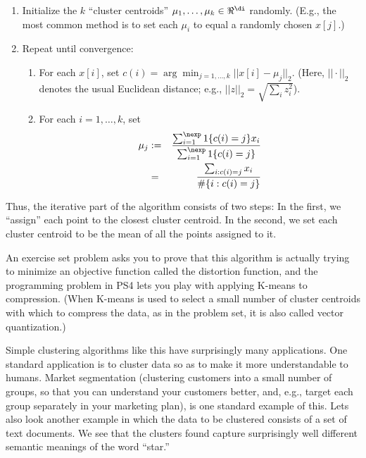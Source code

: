 \begin{enumerate}
\item Initialize the $k$ ``cluster centroids'' $\mu_1, \ldots, \mu_k \in \Re^\di$ randomly.  
(E.g., the most common method is to set each $\mu_i$ to equal a randomly chosen $x[j]$.) 
\item Repeat until convergence: 
\begin{enumerate} 
\item For each $x[i]$, set $c(i) = \arg \min_{j=1,\ldots,k} ||x[i] - \mu_j||_2$.
(Here, $||\cdot||_2$ denotes the usual Euclidean distance; e.g., 
$||z||_2 = \sqrt{\sum_i z_i^2}$). 
\item For each $i=1,\ldots,k$, set
\begin{eqnarray*}
\mu_j &:=& \frac{\sum_{i=1}^\nexp 1\{c(i)=j\}x_i}{\sum_{i=1}^\nexp 1\{c(i)=j\}} \\
      &=& \frac{\sum_{i : c(i) = j} x_i}{\#\{i : c(i) = j\}}
\end{eqnarray*}
\end{enumerate}
\end{enumerate}

Thus, the iterative part of the algorithm consists of two steps: In the first, we 
``assign'' each point to the closest cluster centroid.  In the second, we 
set each cluster centroid to be the mean of all the points assigned to it.


An exercise set problem asks you to prove that this algorithm is actually trying
to minimize an objective function called the distortion function, and the programming
problem in PS4 lets you play with applying K-means to compression.  (When K-means is
used to select a small number of cluster centroids with which to compress the data,
as in the problem set, it is also called vector quantization.)

Simple clustering algorithms like this have surprisingly many applications.  One 
standard application is to cluster data so as to make it more understandable to 
humans.  Market segmentation (clustering customers into a small number of groups, 
so that you can understand your customers better, and, e.g., target each group separately 
in your marketing plan), is one standard example of this.  Lets also look another example 
in which the data to be clustered consists of a set of text documents.  We see that 
the clusters found capture surprisingly well different semantic meanings of the 
word ``star.'' 

